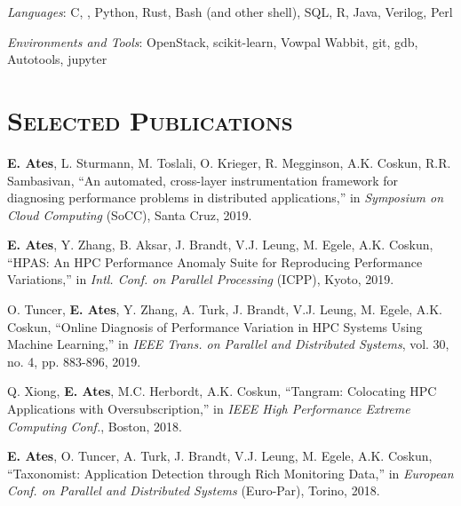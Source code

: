\begin{resume}
  \emph{Languages}: C, \Cplusplus, Python, Rust, Bash (and other shell), SQL, R,
  Java, Verilog, Perl
  \setlength{\parskip}{1mm}

  \emph{Environments and Tools}: OpenStack, scikit-learn, Vowpal Wabbit,
  git, gdb, Autotools, jupyter




  \section{\textsc{Selected Publications}}
  \textbf{E. Ates}, L. Sturmann, M. Toslali, O. Krieger, R. Megginson, A.K.
  Coskun, R.R. Sambasivan, ``An automated, cross-layer instrumentation framework
  for diagnosing performance problems in distributed applications,'' in
  \textit{Symposium on Cloud Computing} (SoCC), Santa Cruz, 2019.

  \vspace{0.1in}
  \textbf{E. Ates}, Y. Zhang, B. Aksar, J. Brandt, V.J. Leung, M.
  Egele, A.K. Coskun, ``HPAS: An HPC Performance Anomaly Suite for Reproducing
  Performance Variations,'' in \textit{Intl. Conf. on Parallel Processing}
  (ICPP), Kyoto, 2019.

  \vspace{0.1in}
  O. Tuncer, \textbf{E. Ates}, Y. Zhang, A. Turk, J. Brandt, V.J. Leung, M.
  Egele, A.K. Coskun, ``Online Diagnosis of Performance Variation in HPC Systems
  Using Machine Learning,'' in \textit{IEEE Trans. on Parallel and
    Distributed Systems}, vol. 30, no. 4, pp. 883-896, 2019.

  \vspace{0.1in}

  Q. Xiong, \textbf{E. Ates}, M.C. Herbordt, A.K. Coskun, ``Tangram: Colocating
  HPC Applications with Oversubscription,'' in \textit{IEEE High Performance
    Extreme Computing Conf.}, Boston, 2018.

  \vspace{0.1in}

  \textbf{E. Ates}, O. Tuncer, A. Turk, J. Brandt, V.J. Leung, M. Egele, A.K.
  Coskun, ``Taxonomist: Application Detection through Rich Monitoring Data,'' in
  \textit{European Conf. on Parallel and Distributed Systems} (Euro-Par),
  Torino, 2018.


\end{resume}

